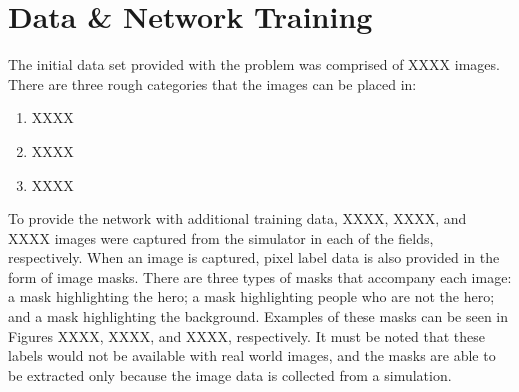 \documentclass[a4paper]{article}
\begin{document}
\section{Data \& Network Training}
The initial data set provided with the problem was comprised of XXXX images. There are three rough categories that the images can be placed in:
\begin{enumerate}
\item XXXX
\item XXXX
\item XXXX
\end{enumerate}
To provide the network with additional training data, XXXX, XXXX, and XXXX images were captured from the simulator in each of the fields, respectively. When an image is captured, pixel label data is also provided in the form of image masks. There are three types of masks that accompany each image: a mask highlighting the hero; a mask highlighting people who are not the hero; and a mask highlighting the background. Examples of these masks can be seen in Figures XXXX, XXXX, and XXXX, respectively. It must be noted that these labels would not be available with real world images, and the masks are able to be extracted only because the image data is collected from a simulation.
\begin{figure}[h]
\begin{minipage}{0.45\textwidth}
\centering
{}
\end{minipage}
\hspace{1cm}
\begin{minipage}{0.45\textwidth}
\centering
{}
\end{minipage}
\end{figure}
\end{document}
